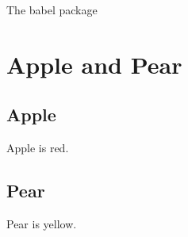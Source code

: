 \documentclass[english]{article} %
\begin{document}
The babel package

\tableofcontents %

\section{Apple and Pear}

\subsection{Apple}
Apple is red.

\subsection{Pear}
Pear is yellow.
\end{document}
